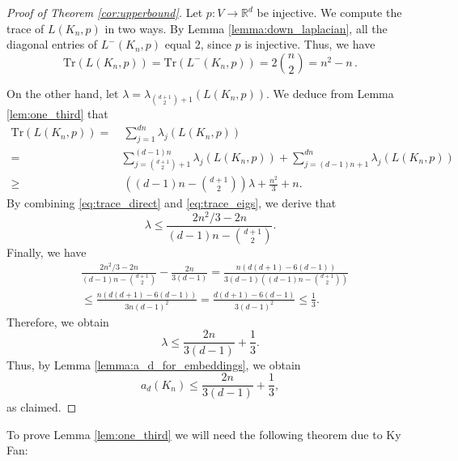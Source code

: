 \documentclass[a4paper,11pt]{article}
\theoremstyle{plain}
\theoremstyle{definition}
\newcommand{\Rea}{{\mathbb R}}
\begin{document}
\upperbound*
\begin{proof}[Proof of Theorem \ref{cor:upperbound}]


Let $p:V\to\Rea^d$ be injective. We compute the trace of $L(K_n,p)$
in two ways. By Lemma \ref{lemma:down_laplacian}, all the diagonal entries of $L^{-}(K_n,p)$ equal $2$, since $p$ is injective. Thus, we have
\begin{equation}\label{eq:trace_direct}
\mathrm{Tr}(L(K_n,p))=\mathrm{Tr}(L^{-}(K_n,p)) = 2\binom n2=n^2-n\,.
\end{equation}

On the other hand, let $\lambda=\lambda_{\binom{d+1}{2}+1}(L(K_n,p))$. We deduce from Lemma \ref{lem:one_third} that
\begin{align}\nonumber
\mathrm{Tr}(L(K_n,p))=&~\sum_{j=1}^{dn}\lambda_j(L(K_n,p)) 
\\\nonumber =&
\sum_{j=\binom{d+1}{2}+1}^{(d-1)n}\lambda_j(L(K_n,p)) +\sum_{j=(d-1)n+1}^{dn}\lambda_j(L(K_n,p)) 
\\ \ge&~ \left((d-1)n-\binom{d+1}2\right)\lambda+\frac {n^2}3+n.
\label{eq:trace_eigs}
\end{align}
By combining \eqref{eq:trace_direct} and \eqref{eq:trace_eigs}, we derive that
\[
\lambda \le  \frac{2n^2/3-2n}{(d-1)n-\binom{d+1}2}.
 \]
Finally, we have
\begin{align*}
    & \frac{2n^2/3-2n}{(d-1)n-\binom{d+1}2}-\frac{2n}{3(d-1)}
    =\frac{n(d(d+1)-6(d-1))}{3(d-1)\left((d-1)n-\binom{d+1}{2}\right)} 
    \\
    &\leq \frac{n(d(d+1)-6(d-1))}{3n(d-1)^2}
    =\frac{d(d+1)-6(d-1)}{3(d-1)^2}
 \leq \frac{1}{3}.
\end{align*}
Therefore, we obtain
\[
\lambda \le \frac{2n}{3(d-1)}+\frac{1}{3}.
\]
Thus, by Lemma \ref{lemma:a_d_for_embeddings}, we obtain
\[
a_d(K_n) \le \frac{2n}{3(d-1)}+\frac{1}{3},
\]
as claimed.
\end{proof}

To prove Lemma \ref{lem:one_third} we will need the following theorem due to Ky Fan:
\end{document}
